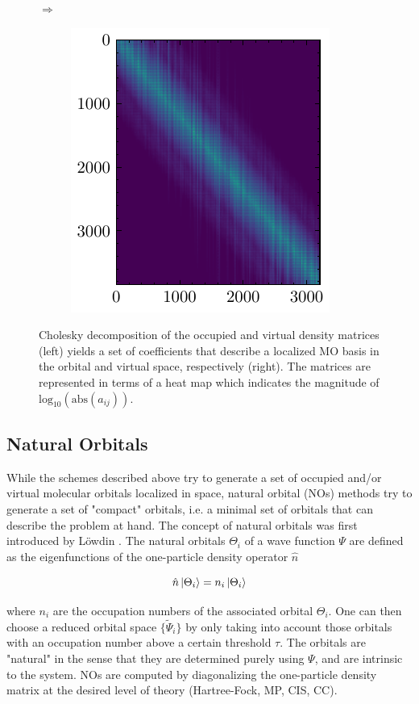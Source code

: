 \begin{figure}[ht]
\begin{subfigure}{0.5\linewidth}
\end{subfigure}
$\Longrightarrow$
\begin{subfigure}{0.4\linewidth}
\centering
\includegraphics[scale=1.0]{Pics/choleskyV}
\end{subfigure}%
\caption[Cholesky decomposition of density matrices]{Cholesky decomposition of the occupied and virtual density matrices (left) yields a set of coefficients that describe a localized MO basis in the orbital and virtual space, respectively (right). The matrices are represented in terms of a heat map which indicates the magnitude of $\mathrm{log}_{10}(\mathrm{abs}(a_{ij}))$.}
\label{fig:LOCORB_CHOL}
\end{figure} 

\subsection{Natural Orbitals}

While the schemes described above try to generate a set of occupied and/or virtual molecular orbitals localized in space, natural orbital (NOs) methods try to generate a set of "compact" orbitals, i.e. a minimal set of orbitals that can describe the problem at hand. The concept of natural orbitals was first introduced by Löwdin \cite{Low1956}. The natural orbitals $\Theta_i$ of a wave function $\Psi$ are defined as the eigenfunctions of the one-particle density operator $\hat{n}$

\begin{equation}
\hat{n}\ket{\Theta_i} = n_i \ket{\Theta_i} 
\end{equation}

\noindent where $n_i$ are the occupation numbers of the associated orbital $\Theta_i$. One can then choose a reduced orbital space $\{\tilde{\Psi}_i\}$ by only taking into account those orbitals with an occupation number above a certain threshold $\tau$. The orbitals are "natural" in the sense that they are determined purely using $\Psi$, and are intrinsic to the system. NOs are computed by diagonalizing the one-particle density matrix at the desired level of theory (Hartree-Fock, MP, CIS, CC). 

